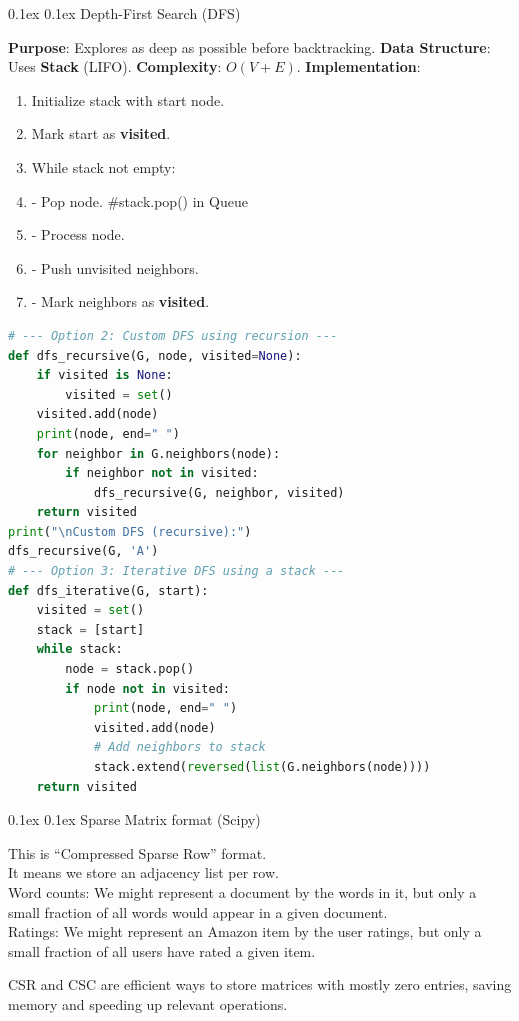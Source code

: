 \documentclass[8pt,landscape]{article}
\makeatletter
\renewcommand{\subsection}{\@startsection{subsection}{2}{0pt}%
    {0.1ex}%
    {0.1ex}%
    {\fontsize{8}{9}\bfseries\color{blue}}} %
\newcommand{\smalltext}[1]{%
  {\fontsize{8}{9}\selectfont\sloppy #1\par}%
}
\makeatother
\begin{document}
\begin{multicols}{3}
\subsection{Depth-First Search (DFS)}
\smalltext{
\textbf{Purpose}: Explores as deep as possible before backtracking.
\textbf{Data Structure}: Uses \textbf{Stack} (LIFO).
\textbf{Complexity}: $O(V+E)$.
\textbf{Implementation}:
\begin{enumerate}[noitemsep, nolistsep, leftmargin=1em]
    \item Initialize stack with start node.
    \item Mark start as \textbf{visited}.
    \item While stack not empty:
    \item \hspace{0.5em}- Pop node. \#stack.pop() in Queue
    \item \hspace{0.5em}- Process node.
    \item \hspace{0.5em}- Push unvisited neighbors.
    \item \hspace{0.5em}- Mark neighbors as \textbf{visited}.
\end{enumerate}
}
\begin{lstlisting}[language=Python]
# --- Option 2: Custom DFS using recursion ---
def dfs_recursive(G, node, visited=None):
    if visited is None:
        visited = set()
    visited.add(node)
    print(node, end=" ")
    for neighbor in G.neighbors(node):
        if neighbor not in visited:
            dfs_recursive(G, neighbor, visited)
    return visited
print("\nCustom DFS (recursive):")
dfs_recursive(G, 'A')
# --- Option 3: Iterative DFS using a stack ---
def dfs_iterative(G, start):
    visited = set()
    stack = [start]
    while stack:
        node = stack.pop()
        if node not in visited:
            print(node, end=" ")
            visited.add(node)
            # Add neighbors to stack
            stack.extend(reversed(list(G.neighbors(node))))
    return visited
\end{lstlisting}

\subsection{Sparse Matrix format (Scipy)}
\smalltext{
This is “Compressed Sparse Row” format. \\
It means we store an adjacency list per row. \\
Word counts: We might represent a document by the words in it, but only a small fraction of all words would appear in a given document. \\
Ratings: We might represent an Amazon item by the user ratings, but only a small fraction of all users have rated a given item. \\
}
\smalltext{
CSR and CSC are efficient ways to store matrices with mostly zero entries, saving memory and speeding up relevant operations.
}


\end{multicols}
\end{document}

